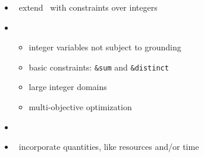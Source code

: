 \begin{frame}{\clingcon}
  \begin{itemize}
  \item {} \ extend \clingo\ with constraints over integers
  \item {} \
    \begin{itemize}
    \item integer variables not subject to grounding
    \item basic constraints: \lstinline{&sum} and \lstinline{&distinct}
    \item large integer domains
    \item multi-objective optimization
    \end{itemize}
  \item {} \ \cite{bakaossc16a}
  \item {} \ incorporate quantities, like resources and/or time
  \end{itemize}
\end{frame}
%
